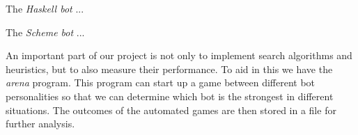 The \emph{Haskell bot} ... %

The \emph{Scheme bot} ... %

An important part of our project is not only to implement search
algorithms and heuristics, but to also measure their performance. To
aid in this we have the \emph{arena} program. This program can start
up a game between different bot personalities so that we can determine
which bot is the strongest in different situations.
The outcomes of the automated games are then stored in a file for further
analysis.

